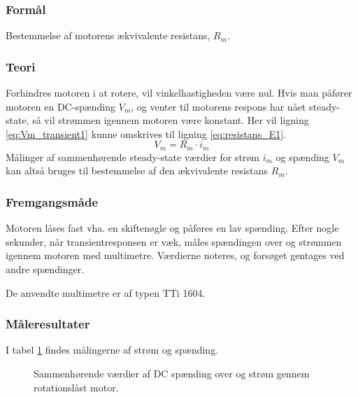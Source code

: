 \subsubsection{Formål}
Bestemmelse af motorens ækvivalente resistans, $R_m$.
\subsubsection{Teori}
Forhindres motoren i at rotere, vil vinkelhastigheden være nul.
Hvis man påfører motoren en DC-spænding $V_m$,
og venter til motorens respons har nået steady-state,
så vil strømmen igennem motoren være konstant.
Her vil ligning \ref{eq:Vm_transient1} kunne omskrives til ligning \ref{eq:resistans_E1}.
\begin{equation}
	V_m=R_m \cdot i_m
	\label{eq:resistans_E1} 
 \end{equation}
Målinger af sammenhørende steady-state værdier for strøm $i_m$ og spænding $V_m$
kan altså bruges til bestemmelse af den ækvivalente resistans $R_m$.
\subsubsection{Fremgangsmåde}
Motoren låses fast vha. en skiftenøgle og påføres en lav spænding.
Efter nogle sekunder, når transientresponsen er væk,
måles spændingen over og strømmen igennem motoren med multimetre.
Værdierne noteres, og forsøget gentages ved andre spændinger.

De anvendte multimetre er af typen TTi 1604.
\subsubsection{Måleresultater}
I tabel \ref{tb:resistans} findes målingerne af strøm og spænding.
\begin{figure}[th!]
	\centering
	
	\captionsetup{type=table}
	\caption[Sammenhørende værdier af DC spænding og strøm]
			{Sammenhørende værdier af DC spænding over og strøm gennem rotationslåst motor.}
	\label{tb:resistans}
\end{figure}
